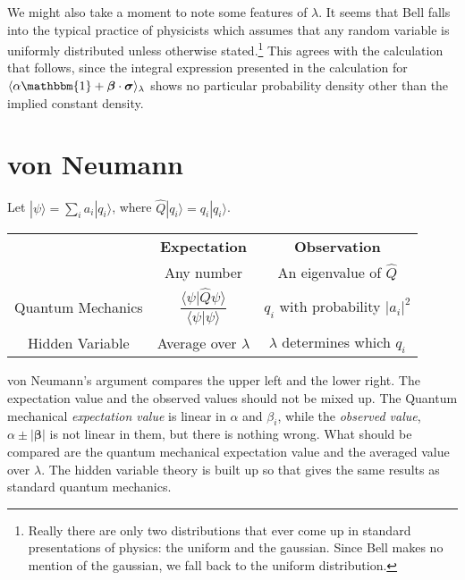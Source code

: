 \documentclass[12pt]{article}
\begin{document}
We might also take a moment to note some features of $\lambda$. It seems that Bell falls into the typical practice of physicists which assumes that any random variable is uniformly distributed unless otherwise stated.\footnote{Really there are only two distributions that ever come up in standard presentations of physics: the uniform and the gaussian. Since Bell makes no mention of the gaussian, we fall back to the uniform distribution.} This agrees with the calculation that follows, since the integral expression presented in the calculation for $\langle \alpha \mathbbm{1} + \bm{\beta} \cdot \bm{\sigma} \rangle_{\lambda}$ shows no particular probability density other than the implied constant density.

\section{von Neumann}
Let $|\psi\rangle=\sum_{i}a_i|q_i\rangle$, where $\hat{Q}|q_i\rangle = q_i |q_i\rangle$.
\begin{center}
  \begin{tabular}{ccc}
    \toprule
    & \textbf{Expectation} & \textbf{Observation} \\
    & Any number & An eigenvalue of $\hat{Q}$ \\
    \midrule
    Quantum Mechanics & $\dfrac{\langle \psi | \hat{Q}\psi \rangle}{\langle \psi | \psi \rangle}$ & $q_i$ with probability $|a_i|^2$\\
    Hidden Variable & Average over $\lambda$ & $\lambda$ determines which $q_i$ \\
    \bottomrule
  \end{tabular}
\end{center}
von Neumann's argument compares the upper left and the lower
right. The expectation value and the observed values should not be
mixed up. The Quantum mechanical {\it expectation value} is linear in
$\alpha$ and $\beta_i$, while the {\it observed value},
$\alpha\pm|\bm{\beta}|$ is not linear in them, but there is nothing
wrong. What should be compared are the quantum mechanical expectation
value and the averaged value over $\lambda$. The hidden variable
theory is built up so that gives the same results as standard quantum mechanics.
\end{document}
